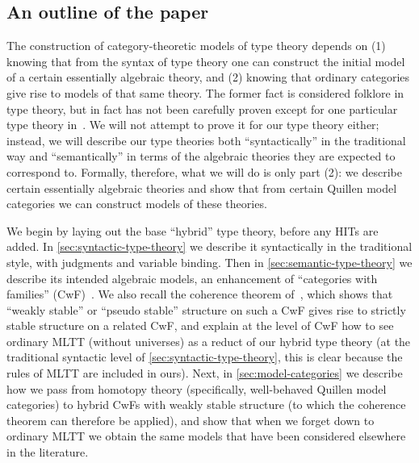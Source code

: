 \documentclass{amsart}
\begin{document}
\subsection{An outline of the paper}
\label{sec:outline}

The construction of category-theoretic models of type theory depends on (1) knowing that from the syntax of type theory one can construct the initial model of a certain essentially algebraic theory, and (2) knowing that ordinary categories give rise to models of that same theory.
The former fact is considered folklore in type theory, but in fact has not been carefully proven except for one particular type theory in~\cite{streicher:semtt}.
We will not attempt to prove it for our type theory either; instead, we will describe our type theories both ``syntactically'' in the traditional way and ``semantically'' in terms of the algebraic theories they are expected to correspond to.
Formally, therefore, what we will do is only part (2): we describe certain essentially algebraic theories and show that from certain Quillen model categories we can construct models of these theories.

We begin by laying out the base ``hybrid'' type theory, before any HITs are added.
In \cref{sec:syntactic-type-theory} we describe it syntactically in the traditional style, with judgments and variable binding.
Then in \cref{sec:semantic-type-theory} we describe its intended algebraic models, an enhancement of ``categories with families'' (CwF)~\cite{?}.
We also recall the coherence theorem of~\cite{lw:localuniv}, which shows that ``weakly stable'' or ``pseudo stable'' structure on such a CwF gives rise to strictly stable structure on a related CwF, and explain at the level of CwF how to see ordinary MLTT (without universes) as a reduct of our hybrid type theory (at the traditional syntactic level of \cref{sec:syntactic-type-theory}, this is clear because the rules of MLTT are included in ours).
Next, in \cref{sec:model-categories} we describe how we pass from homotopy theory (specifically, well-behaved Quillen model categories) to hybrid CwFs with weakly stable structure (to which the coherence theorem can therefore be applied), and show that when we forget down to ordinary MLTT we obtain the same models that have been considered elsewhere in the literature.
\end{document}
